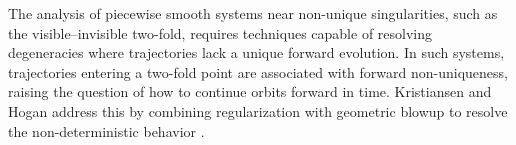 \documentclass[12pt, a4paper, oneside]{book}
\theoremstyle{plain}
\newtheorem{theorem}{Theorem}[chapter]
\theoremstyle{definition}
\theoremstyle{remark}
\theoremstyle{definition}
\begin{document}

The analysis of piecewise smooth systems near non-unique singularities, such as the visible–invisible two-fold, requires techniques capable of resolving degeneracies where trajectories lack a unique forward evolution. In such systems, trajectories entering a two-fold point are associated with forward non-uniqueness, raising the question of how to continue orbits forward in time. Kristiansen and Hogan address this by combining regularization with geometric blowup to resolve the non-deterministic behavior \cite{kristiansen2019resolution}.
\end{document}
